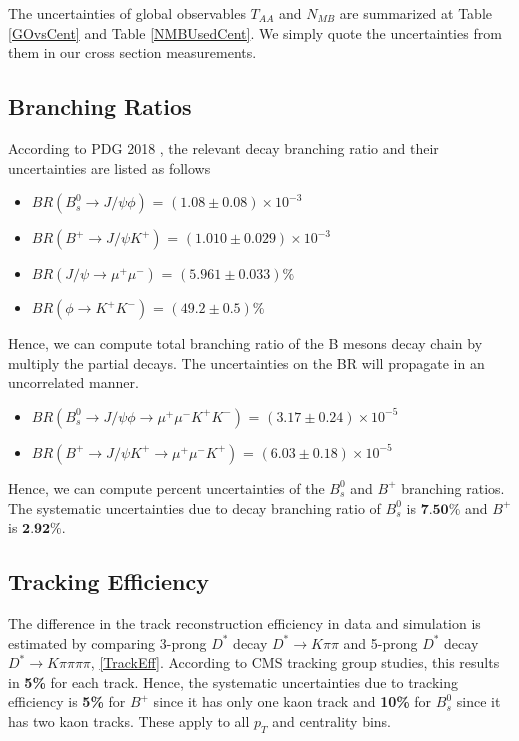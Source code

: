 The uncertainties of global observables $T_{AA}$ and $N_{MB}$ are summarized at Table \ref{GOvsCent} and Table \ref{NMBUsedCent}. We simply quote the uncertainties from them in our cross section measurements. 

\subsection{Branching Ratios}

According to PDG 2018 \cite{PDG2018}, the relevant decay branching ratio and their uncertainties are listed as follows

\begin{itemize}
\item $BR(B^0_s \rightarrow J/\psi \phi)$ = $(1.08 \pm 0.08) \times 10^{-3}$
\item $BR(B^+ \rightarrow J/\psi K^+)$ = $(1.010 \pm 0.029) \times 10^{-3}$
\item $BR(J/\psi \rightarrow \mu^+ \mu^-)$ = $(5.961 \pm 0.033)\%$
\item $BR(\phi \rightarrow K^+ K^-)$ = $(49.2 \pm 0.5)\%$
\end{itemize}

Hence, we can compute total branching ratio of the B mesons decay chain by multiply the partial decays. The uncertainties on the BR will propagate in an uncorrelated manner.   

\begin{itemize}
\item $BR(B^0_s \rightarrow J/\psi \phi  \rightarrow \mu^+ \mu^- K^+ K^-)$ = $(3.17 \pm 0.24) \times 10^{-5}$
\item $BR(B^+ \rightarrow J/\psi K^+  \rightarrow \mu^+ \mu^- K^+)$ = $(6.03 \pm 0.18) \times 10^{-5}$ 
\end{itemize}

Hence, we can compute percent uncertainties of the $B^0_s$ and $B^+$ branching ratios. The systematic uncertainties due to decay branching ratio of $B^0_s$ is $\textbf{7.50\%}$ and $B^+$ is  $\textbf{2.92\%}$.

\subsection{Tracking Efficiency}

The difference in the track reconstruction efficiency in data and simulation is estimated by comparing 3-prong $D^{*}$ decay $D^{*} \rightarrow K \pi\pi$ and 5-prong $D^{*}$ decay $D^{*} \rightarrow K \pi\pi\pi\pi$, \ref{TrackEff}. According to CMS tracking group studies, this results in \textbf{5\%} for each track. Hence, the systematic uncertainties due to tracking efficiency is \textbf{5\%} for $B^+$ since it has only one kaon track and \textbf{10\%} for $B^0_s$ since it has two kaon tracks. These apply to all $p_T$ and centrality bins.

